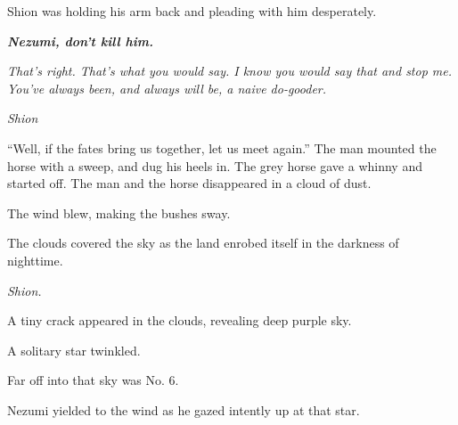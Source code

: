 Shion was holding his arm back and pleading with him desperately.

\emph{\textbf{Nezumi, don't kill him.}}

\emph{That's right. That's what you would say. I know you would say that and
stop me. You've always been, and always will be, a naive do-gooder.}

\emph{Shion\el }

``Well, if the fates bring us together, let us meet again.'' The man
mounted the horse with a sweep, and dug his heels in. The grey horse
gave a whinny and started off. The man and the horse disappeared in a
cloud of dust.

The wind blew, making the bushes sway.

The clouds covered the sky as the land enrobed itself in the
darkness of nighttime.

\emph{Shion.}

A tiny crack appeared in the clouds, revealing deep purple sky.

A solitary star twinkled.

Far off into that sky was No. 6.

Nezumi yielded to the wind as he gazed intently up at that star.
